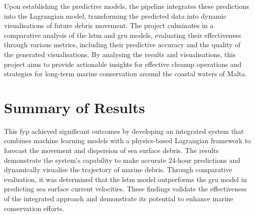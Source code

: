 Upon establishing the predictive models, the pipeline integrates these predictions into the Lagrangian model, transforming the predicted data into dynamic visualisations of future debris movement. The project culminates in a comparative analysis of the \acrshort{lstm} and \acrshort{gru} models, evaluating their effectiveness through various metrics, including their predictive accuracy and the quality of the generated visualisations. By analysing the results and visualisations, this project aims to provide actionable insights for effective cleanup operations and strategies for long-term marine conservation around the coastal waters of Malta.

\section{Summary of Results}
\label{sec:summary_of_results}
This \acrshort{fyp} achieved significant outcomes by developing an integrated system that combines machine learning models with a physics-based Lagrangian framework to forecast the movement and dispersion of sea surface debris. The results demonstrate the system's capability to make accurate 24-hour predictions and dynamically visualise the trajectory of marine debris. Through comparative evaluation, it was determined that the \acrshort{lstm} model outperforms the \acrshort{gru} model in predicting sea surface current velocities. These findings validate the effectiveness of the integrated approach and demonstrate its potential to enhance marine conservation efforts.

